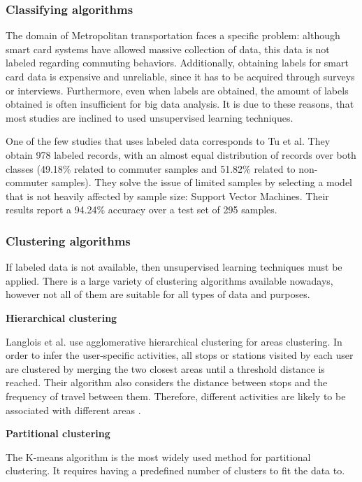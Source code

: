 \documentclass{article}
\begin{document}
\subsubsection{Classifying algorithms}
The domain of Metropolitan transportation faces a specific problem: although smart card systems have allowed massive collection of data, this data is not labeled regarding commuting behaviors. Additionally, obtaining labels for smart card data is expensive and unreliable, since it has to be acquired through surveys or interviews. Furthermore, even when labels are obtained, the amount of labels obtained is often insufficient for big data analysis. It is due to these reasons, that most studies are inclined to used unsupervised learning techniques. 

One of the few studies that uses labeled data corresponds to Tu et al. They obtain 978 labeled records, with an almost equal distribution of records over both classes (49.18\% related to commuter samples and 51.82\% related to non-commuter samples). They solve the issue of limited samples by selecting a model that is not heavily affected by sample size: Support Vector Machines. Their results report a 94.24\% accuracy over a test set of 295 samples. 

\subsubsection{Clustering algorithms} 
If labeled data is not available, then unsupervised learning techniques must be applied. There is a large variety of clustering algorithms available nowadays, however not all of them are suitable for all types of data and purposes.

\textbf{Hierarchical clustering}

Langlois et al. use agglomerative hierarchical clustering for areas clustering. In order to infer the user-specific activities, all stops or stations visited by each user are clustered by merging the two closest areas until a threshold distance is reached. Their algorithm also considers the distance between stops and the frequency of travel between them. Therefore, different activities are likely to be associated with different areas \cite{langlois2016inferring}.

\textbf{Partitional clustering}

The K-means algorithm is the most widely used method for partitional clustering. It requires having a predefined number of clusters to fit the data to. 
\end{document}
